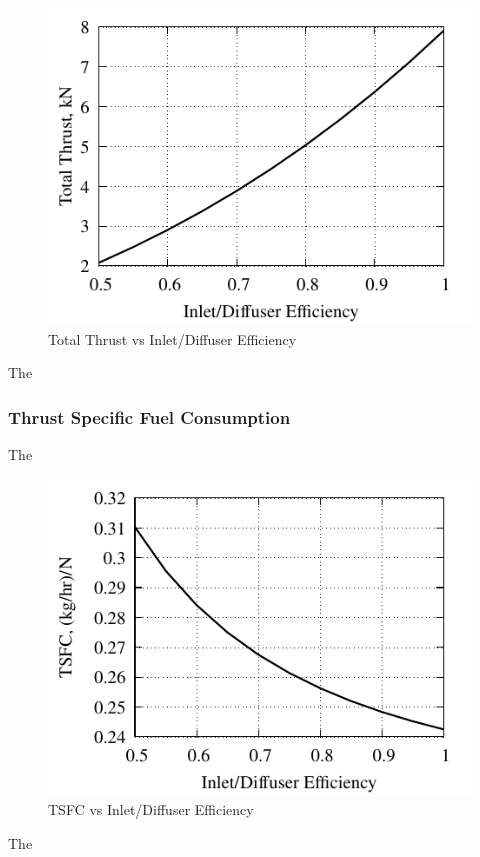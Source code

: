 \documentclass[conf]{new-aiaa} %
\begin{document}
\begin{figure}[hbt!]
\centering
\includegraphics[]{media/performance_parameter_files/part_f_T.pdf}
\caption{\label{fig:partft} Total Thrust vs Inlet/Diffuser Efficiency}
\end{figure}
The

\subsubsection{Thrust Specific Fuel Consumption}
The

\begin{figure}[hbt!]
\centering
\includegraphics[]{media/performance_parameter_files/part_f_TSFC.pdf}
\caption{\label{fig:partftsfc} TSFC vs Inlet/Diffuser Efficiency}
\end{figure}
The
\end{document}
